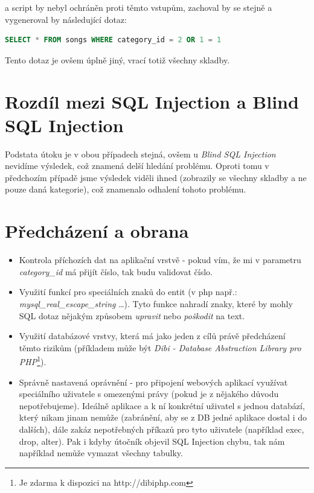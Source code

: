 \documentclass[12pt, a4paper]{report}
\begin{document}
a script by nebyl ochráněn proti těmto  vstupům, zachoval by se stejně a vygeneroval by následující dotaz:
\begin{lstlisting}[label=web_app_url_4,language=SQL, caption=Vygenerovaný SQL dotaz z upraveného URL]
SELECT * FROM songs WHERE category_id = 2 OR 1 = 1
\end{lstlisting}

Tento dotaz je ovšem úplně jiný, vrací totiž všechny skladby.

\section{Rozdíl mezi SQL Injection a Blind SQL Injection}
Podstata útoku je v obou případech stejná, ovšem u \textit{Blind SQL Injection} nevidíme výsledek, což znamená delší hledání problému. Oproti tomu v předchozím případě jsme výsledek viděli ihned (zobrazily se všechny skladby a ne pouze daná kategorie), což znamenalo odhalení tohoto problému. 

\section{Předcházení a obrana}
\begin{itemize}
\item Kontrola příchozích dat na aplikační vrstvě - pokud vím, že mi v parametru \textit{category\_id} má přijít číslo, tak budu validovat číslo.
\item Využití funkcí pro  speciálních znaků do entit (v php např.: \textit{mysql\_real\_escape\_string} \ldots). Tyto funkce nahradí znaky, které by mohly SQL dotaz nějakým způsobem \textit{upravit} nebo \textit{poškodit} na text.
\item Využití databázové vrstvy, která má jako jeden z cílů právě předcházení těmto rizikům (příkladem může být \textit{Dibi - Database Abstraction Library pro PHP}\footnote{Je zdarma k dispozici na http://dibiphp.com}).
\item Správně nastavená oprávnění - pro připojení webových aplikací využívat speciálního uživatele s omezenými právy (pokud je z nějakého důvodu nepotřebujeme). Ideálně aplikace a k ní konkrétní uživatel s jednou databází, který nikam jinam nemůže (zabránění, aby se z DB jedné aplikace dostal i do dalších), dále zakáz nepotřebných příkazů pro tyto uživatele (například exec, drop, alter). Pak i kdyby útočník objevil SQL Injection chybu, tak nám například nemůže vymazat všechny tabulky.
\end{itemize}
\end{document}
